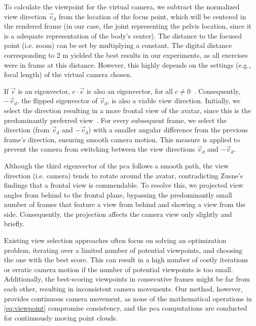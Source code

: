 To calculate the viewpoint for the virtual camera, we subtract the normalized view direction \(\vec{v}_d\) from the location of the focus point, which will be centered in the rendered frame (in our case, the joint representing the pelvis location, since it is a adequate representation of the body's center). The distance to the focused point (i.e. zoom) can be set by multiplying a constant. The digital distance corresponding to 2 m yielded the best results in our experiments, as all exercises were in frame at this distance. However, this highly depends on the settings (e.g., focal length) of the virtual camera chosen.


If \(\vec{e}\) is an eigenvector, \(c \cdot \vec{e}\) is also an eigenvector, for all \(c \neq 0\)~\cite{borisenko}. Consequently, \(-\vec{v}_d\), the flipped eigenvector of \(\vec{v}_d\), is also a viable view direction. Initially, we select the direction resulting in a more frontal view of the avatar, since this is the predominantly preferred view~\cite{zusne1970vpf}. For every subsequent frame, we select the direction (from \(\vec{v}_d\) and \(-\vec{v}_d\)) with a smaller angular difference from the previous frame's direction, ensuring smooth camera motion. This measure is applied to prevent the camera from switching between the view directions \(\vec{v}_d\) and \(-\vec{v}_d\).

Although the third eigenvector of the \acrshort{pca} follows a smooth path, the view direction (i.e. camera) tends to rotate around the avatar, contradicting Zusne's~\cite{zusne1970vpf} findings that a frontal view is commendable. To resolve this, we projected view angles from behind to the frontal plane, bypassing the predominantly small number of frames that feature a view from behind and showing a view from the side. Consequently, the projection affects the camera view only slightly and briefly.

Existing view selection approaches often focus on solving an optimization problem, iterating over a limited number of potential viewpoints, and choosing the one with the best score. This can result in a high number of costly iterations or erratic camera motion if the number of potential viewpoints is too small. Additionally, the best-scoring viewpoints in consecutive frames might be far from each other, resulting in inconsistent camera movements. Our method, however, provides continuous camera movement, as none of the mathematical operations in \autoref{eq:viewpoint} compromise consistency, and the \acrshort{pca} computations are conducted for continuously moving point clouds.

